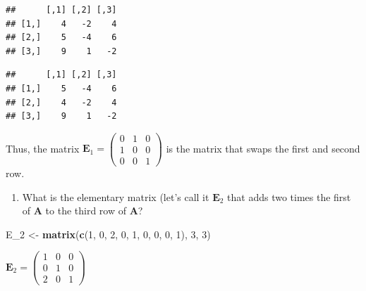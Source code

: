 \documentclass[
]{book}
\newenvironment{Shaded}{\begin{snugshade}}{\end{snugshade}}
\newcommand{\CommentTok}[1]{\textcolor[rgb]{0.56,0.35,0.01}{\textit{#1}}}
\newcommand{\DecValTok}[1]{\textcolor[rgb]{0.00,0.00,0.81}{#1}}
\newcommand{\KeywordTok}[1]{\textcolor[rgb]{0.13,0.29,0.53}{\textbf{#1}}}
\newcommand{\NormalTok}[1]{#1}
\newcommand{\OperatorTok}[1]{\textcolor[rgb]{0.81,0.36,0.00}{\textbf{#1}}}
\newcommand{\StringTok}[1]{\textcolor[rgb]{0.31,0.60,0.02}{#1}}
\providecommand{\tightlist}{%
  \setlength{\itemsep}{0pt}\setlength{\parskip}{0pt}}
\theoremstyle{definition}
\theoremstyle{definition}
\theoremstyle{definition}
\theoremstyle{remark}
\begin{document}
\begin{itemize}
\begin{verbatim}
##      [,1] [,2] [,3]
## [1,]    4   -2    4
## [2,]    5   -4    6
## [3,]    9    1   -2
\end{verbatim}

\begin{Shaded}
\end{Shaded}

\begin{verbatim}
##      [,1] [,2] [,3]
## [1,]    5   -4    6
## [2,]    4   -2    4
## [3,]    9    1   -2
\end{verbatim}

  Thus, the matrix \(\mathbf{E}_1 = \begin{pmatrix} 0 & 1 & 0 \\ 1 & 0 & 0 \\ 0 & 0 & 1 \end{pmatrix}\) is the matrix that swaps the first and second row.

  \begin{enumerate}
  \def\labelenumi{\arabic{enumi})}
  \setcounter{enumi}{1}
  \tightlist
  \item
    What is the elementary matrix (let's call it \(\mathbf{E}_2\) that adds two times the first of \(\mathbf{A}\) to the third row of \(\mathbf{A}\)?
  \end{enumerate}

\begin{Shaded}
\begin{Highlighting}[]
\NormalTok{E_}\DecValTok{2}\NormalTok{ <-}\StringTok{ }\KeywordTok{matrix}\NormalTok{(}\KeywordTok{c}\NormalTok{(}\DecValTok{1}\NormalTok{, }\DecValTok{0}\NormalTok{, }\DecValTok{2}\NormalTok{, }\DecValTok{0}\NormalTok{, }\DecValTok{1}\NormalTok{, }\DecValTok{0}\NormalTok{, }\DecValTok{0}\NormalTok{, }\DecValTok{0}\NormalTok{, }\DecValTok{1}\NormalTok{), }\DecValTok{3}\NormalTok{, }\DecValTok{3}\NormalTok{)}
\end{Highlighting}
\end{Shaded}

  \(\mathbf{E}_2 = \begin{pmatrix} 1 & 0 & 0 \\ 0 & 1 & 0 \\ 2 & 0 & 1 \end{pmatrix}\)


\end{itemize}
\end{document}
